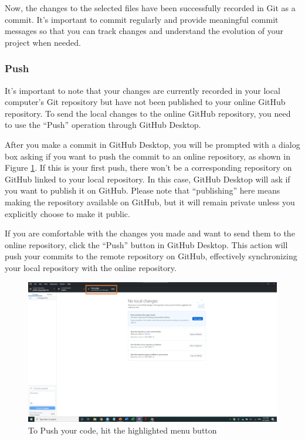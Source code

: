\documentclass[
]{article}
\begin{document}
Now, the changes to the selected files have been successfully recorded in Git as a commit. It's important to commit regularly and provide meaningful commit messages so that you can track changes and understand the evolution of your project when needed.

\hypertarget{push}{%
\subsubsection{Push}\label{push}}

It's important to note that your changes are currently recorded in your local computer's Git repository but have not been published to your online GitHub repository. To send the local changes to the online GitHub repository, you need to use the ``Push'' operation through GitHub Desktop.

After you make a commit in GitHub Desktop, you will be prompted with a dialog box asking if you want to push the commit to an online repository, as shown in Figure \ref{fig:gitdesktop4}. If this is your first push, there won't be a corresponding repository on GitHub linked to your local repository. In this case, GitHub Desktop will ask if you want to publish it on GitHub. Please note that ``publishing'' here means making the repository available on GitHub, but it will remain private unless you explicitly choose to make it public.

If you are comfortable with the changes you made and want to send them to the online repository, click the ``Push'' button in GitHub Desktop. This action will push your commits to the remote repository on GitHub, effectively synchronizing your local repository with the online repository.

\begin{figure}

{\centering \includegraphics[width=61.11in]{image/git_image05} 

}

\caption{To Push your code, hit the highlighted menu button}\label{fig:gitdesktop4}
\end{figure}
\end{document}
